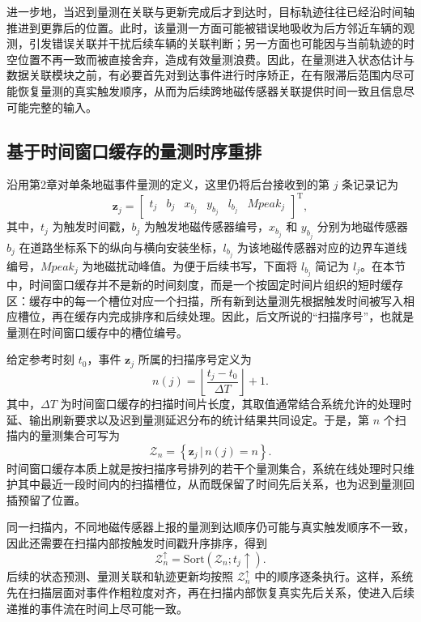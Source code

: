 \documentclass{xdupgthesis}
\begin{document}
进一步地，当迟到量测在关联与更新完成后才到达时，目标轨迹往往已经沿时间轴推进到更靠后的位置。此时，该量测一方面可能被错误地吸收为后方邻近车辆的观测，引发错误关联并干扰后续车辆的关联判断；另一方面也可能因与当前轨迹的时空位置不再一致而被直接舍弃，造成有效量测浪费。因此，在量测进入状态估计与数据关联模块之前，有必要首先对到达事件进行时序矫正，在有限滞后范围内尽可能恢复量测的真实触发顺序，从而为后续跨地磁传感器关联提供时间一致且信息尽可能完整的输入。

\subsection{基于时间窗口缓存的量测时序重排}

沿用第2章对单条地磁事件量测的定义，这里仍将后台接收到的第 $j$ 条记录记为
\begin{equation}
	\mathbf z_j=
	\begin{bmatrix}
		t_j &
		b_j &
		x_{b_j} &
		y_{b_j} &
		l_{b_j} &
		Mpeak_j
	\end{bmatrix}^{\mathrm T},
	\label{eq:ch3_event_def}
\end{equation}
其中，$t_j$ 为触发时间戳，$b_j$ 为触发地磁传感器编号，$x_{b_j}$ 和 $y_{b_j}$ 分别为地磁传感器 $b_j$ 在道路坐标系下的纵向与横向安装坐标，$l_{b_j}$ 为该地磁传感器对应的边界车道线编号，$Mpeak_j$ 为地磁扰动峰值。为便于后续书写，下面将 $l_{b_j}$ 简记为 $l_j$。在本节中，时间窗口缓存并不是新的时间刻度，而是一个按固定时间片组织的短时缓存区：缓存中的每一个槽位对应一个扫描，所有新到达量测先根据触发时间被写入相应槽位，再在缓存内完成排序和后续处理。因此，后文所说的“扫描序号”，也就是量测在时间窗口缓存中的槽位编号。

给定参考时刻 $t_0$，事件 $\mathbf z_j$ 所属的扫描序号定义为
\begin{equation}
	n(j)=\left\lfloor \frac{t_j-t_0}{\Delta T} \right\rfloor +1.
	\label{eq:ch3_scan_index}
\end{equation}
其中，$\Delta T$ 为时间窗口缓存的扫描时间片长度，其取值通常结合系统允许的处理时延、输出刷新要求以及迟到量测延迟分布的统计结果共同设定。于是，第 $n$ 个扫描内的量测集合可写为
\begin{equation}
	\mathcal Z_n=
	\left\{
	\mathbf z_j\,\big|\, n(j)=n
	\right\}.
	\label{eq:ch3_scan_set}
\end{equation}
时间窗口缓存本质上就是按扫描序号排列的若干个量测集合，系统在线处理时只维护其中最近一段时间内的扫描槽位，从而既保留了时间先后关系，也为迟到量测回插预留了位置。

同一扫描内，不同地磁传感器上报的量测到达顺序仍可能与真实触发顺序不一致，因此还需要在扫描内部按触发时间戳升序排序，得到
\begin{equation}
	\mathcal Z_n^{\uparrow}=\mathrm{Sort}\left(\mathcal Z_n; t_j\uparrow\right).
	\label{eq:ch3_scan_sort}
\end{equation}
后续的状态预测、量测关联和轨迹更新均按照 $\mathcal Z_n^{\uparrow}$ 中的顺序逐条执行。这样，系统先在扫描层面对事件作粗粒度对齐，再在扫描内部恢复真实先后关系，使进入后续递推的事件流在时间上尽可能一致。
\end{document}
